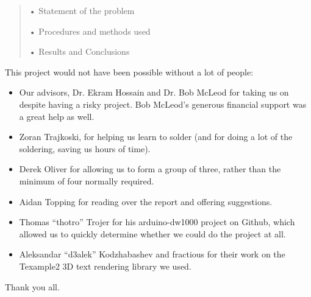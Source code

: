 \documentclass[
11pt, %
oneside, %
english, %
onehalfspacing, %
nolistspacing, %
hidelinks, %
headsepline, %
consistentlayout, %
table, %
]{MastersDoctoralThesis} %
\begin{document}

\begin{abstract}
\addchaptertocentry{\abstractname} %
•  Statement of the problem

•  Procedures and methods used

•  Results and Conclusions
\end{abstract}


\begin{acknowledgements}
\addchaptertocentry{\acknowledgementname} %
This project would not have been possible without a lot of people:

\begin{itemize}
	\item Our advisors, Dr. Ekram Hossain and Dr. Bob McLeod for taking us on despite having a risky project. Bob McLeod's generous financial support was a great help as well.
	\item Zoran Trajkoski, for helping us learn to solder (and for doing a lot of the soldering, saving us hours of time).
	\item Derek Oliver for allowing us to form a group of three, rather than the minimum of four normally required. 
	\item Aidan Topping for reading over the report and offering suggestions.
	\item Thomas ``thotro'' Trojer for his arduino-dw1000 project on Github, which allowed us to quickly determine whether we could do the project at all.
	\item Aleksandar ``d3alek'' Kodzhabashev and fractious for their work on the Texample2 3D text rendering library we used.
\end{itemize}

Thank you all.
\end{acknowledgements}
\end{document}
